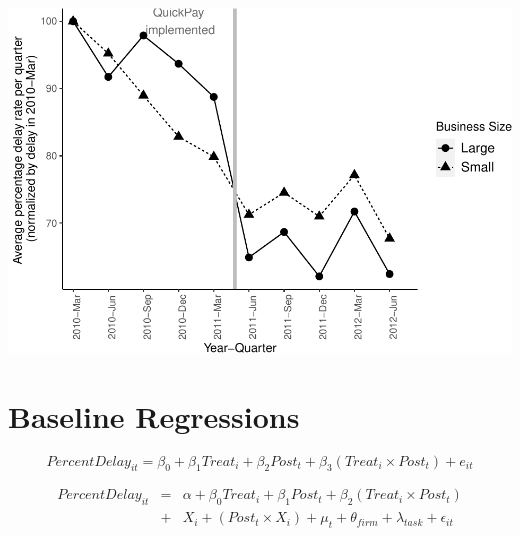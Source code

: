 \documentclass[
]{article}
\begin{document}
\includegraphics{qp_first_pc_delay_non_zero_files/figure-latex/normalized_plot-1.pdf}

\hypertarget{baseline-regressions}{%
\section{Baseline Regressions}\label{baseline-regressions}}

\[ PercentDelay_{it} = \beta_0 + \beta_1 Treat_i + \beta_2 Post_t + \beta_3 (Treat_i \times Post_t) + e_{it}\]

\[ \begin{aligned} PercentDelay_{it} &=& \alpha+\beta_0 Treat_i + \beta_1 Post_t + \beta_2 (Treat_i \times Post_t)\\
&+&  X_i + (Post_t \times X_i) + \mu_t + \theta_{firm} + \lambda_{task}+ \epsilon_{it}
\end{aligned}\]
\end{document}
